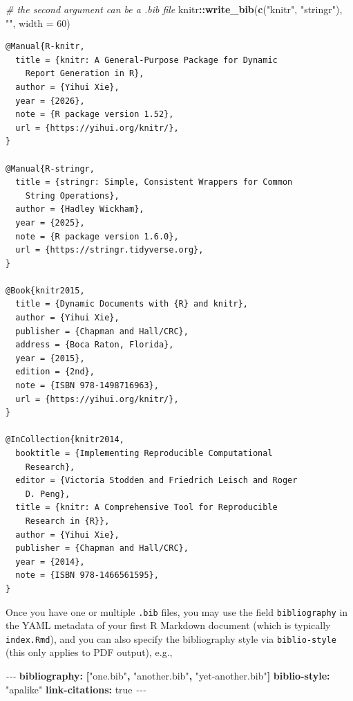 \documentclass[
  12pt,
]{krantz}
\newenvironment{Shaded}{\begin{snugshade}}{\end{snugshade}}
\newcommand{\AttributeTok}[1]{\textcolor[rgb]{0.13,0.29,0.53}{#1}}
\newcommand{\CharTok}[1]{\textcolor[rgb]{0.31,0.60,0.02}{#1}}
\newcommand{\CommentTok}[1]{\textcolor[rgb]{0.56,0.35,0.01}{\textit{#1}}}
\newcommand{\DecValTok}[1]{\textcolor[rgb]{0.00,0.00,0.81}{#1}}
\newcommand{\FunctionTok}[1]{\textcolor[rgb]{0.13,0.29,0.53}{\textbf{#1}}}
\newcommand{\KeywordTok}[1]{\textcolor[rgb]{0.13,0.29,0.53}{\textbf{#1}}}
\newcommand{\NormalTok}[1]{#1}
\newcommand{\PreprocessorTok}[1]{\textcolor[rgb]{0.56,0.35,0.01}{\textit{#1}}}
\newcommand{\SpecialCharTok}[1]{\textcolor[rgb]{0.81,0.36,0.00}{\textbf{#1}}}
\newcommand{\StringTok}[1]{\textcolor[rgb]{0.31,0.60,0.02}{#1}}
\theoremstyle{definition}
\theoremstyle{definition}
\theoremstyle{definition}
\theoremstyle{definition}
\theoremstyle{remark}
\begin{document}
\begin{Shaded}
\begin{Highlighting}[]
\CommentTok{\# the second argument can be a .bib file}
\NormalTok{knitr}\SpecialCharTok{::}\FunctionTok{write\_bib}\NormalTok{(}\FunctionTok{c}\NormalTok{(}\StringTok{"knitr"}\NormalTok{, }\StringTok{"stringr"}\NormalTok{), }\StringTok{""}\NormalTok{, }\AttributeTok{width =} \DecValTok{60}\NormalTok{)}
\end{Highlighting}
\end{Shaded}

\begin{verbatim}
@Manual{R-knitr,
  title = {knitr: A General-Purpose Package for Dynamic
    Report Generation in R},
  author = {Yihui Xie},
  year = {2026},
  note = {R package version 1.52},
  url = {https://yihui.org/knitr/},
}

@Manual{R-stringr,
  title = {stringr: Simple, Consistent Wrappers for Common
    String Operations},
  author = {Hadley Wickham},
  year = {2025},
  note = {R package version 1.6.0},
  url = {https://stringr.tidyverse.org},
}

@Book{knitr2015,
  title = {Dynamic Documents with {R} and knitr},
  author = {Yihui Xie},
  publisher = {Chapman and Hall/CRC},
  address = {Boca Raton, Florida},
  year = {2015},
  edition = {2nd},
  note = {ISBN 978-1498716963},
  url = {https://yihui.org/knitr/},
}

@InCollection{knitr2014,
  booktitle = {Implementing Reproducible Computational
    Research},
  editor = {Victoria Stodden and Friedrich Leisch and Roger
    D. Peng},
  title = {knitr: A Comprehensive Tool for Reproducible
    Research in {R}},
  author = {Yihui Xie},
  publisher = {Chapman and Hall/CRC},
  year = {2014},
  note = {ISBN 978-1466561595},
}
\end{verbatim}

Once you have one or multiple \texttt{.bib} files, you may use the field \texttt{bibliography} in the YAML metadata of your first R Markdown document (which is typically \texttt{index.Rmd}), and you can also specify the bibliography style via \texttt{biblio-style} (this only applies to PDF output), e.g.,

\begin{Shaded}
\begin{Highlighting}[]
\PreprocessorTok{{-}{-}{-}}
\FunctionTok{bibliography}\KeywordTok{:}\AttributeTok{ }\KeywordTok{[}\StringTok{"one.bib"}\KeywordTok{,}\AttributeTok{ }\StringTok{"another.bib"}\KeywordTok{,}\AttributeTok{ }\StringTok{"yet{-}another.bib"}\KeywordTok{]}
\FunctionTok{biblio{-}style}\KeywordTok{:}\AttributeTok{ }\StringTok{"apalike"}
\FunctionTok{link{-}citations}\KeywordTok{:}\AttributeTok{ }\CharTok{true}
\PreprocessorTok{{-}{-}{-}}
\end{Highlighting}
\end{Shaded}
\end{document}
